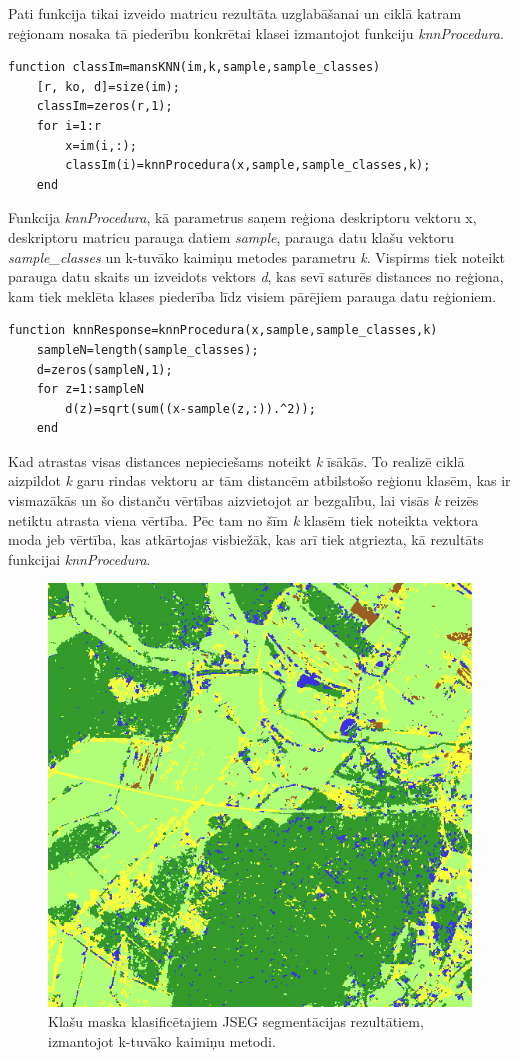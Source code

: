 \documentclass[12pt,paper=a4]{report}
\begin{document}
Pati funkcija tikai izveido matricu rezultāta uzglabāšanai un ciklā katram reģionam nosaka tā piederību konkrētai klasei izmantojot funkciju \textit{knnProcedura}.
\begin{lstlisting}
function classIm=mansKNN(im,k,sample,sample_classes)
    [r, ko, d]=size(im);
    classIm=zeros(r,1);
    for i=1:r
        x=im(i,:);
        classIm(i)=knnProcedura(x,sample,sample_classes,k);
    end
\end{lstlisting}\par
Funkcija \textit{knnProcedura}, kā parametrus saņem reģiona deskriptoru vektoru x, deskriptoru matricu parauga datiem \textit{sample}, parauga datu klašu vektoru \textit{sample_classes} un k-tuvāko kaimiņu metodes parametru \textit{k}. Vispirms tiek noteikt parauga datu skaits un izveidots vektors \textit{d}, kas sevī saturēs distances no reģiona, kam tiek meklēta klases piederība līdz visiem pārējiem parauga datu reģioniem.
\begin{lstlisting}
function knnResponse=knnProcedura(x,sample,sample_classes,k)
    sampleN=length(sample_classes);
    d=zeros(sampleN,1);
    for z=1:sampleN
        d(z)=sqrt(sum((x-sample(z,:)).^2));
    end
\end{lstlisting}\par
Kad atrastas visas distances nepieciešams noteikt \textit{k} īsākās. To realizē ciklā aizpildot \textit{k} garu rindas vektoru ar tām distancēm atbilstošo reģionu klasēm, kas ir vismazākās un šo distanču vērtības aizvietojot ar bezgalību, lai visās \textit{k} reizēs netiktu atrasta viena vērtība. Pēc tam no šīm \textit{k} klasēm tiek noteikta vektora moda jeb vērtība, kas atkārtojas visbiežāk, kas arī tiek atgriezta, kā rezultāts funkcijai \textit{knnProcedura}.
\begin{figure}[h!]
\centering
\includegraphics[width=.6\linewidth]{result}
\caption{Klašu maska klasificētajiem JSEG segmentācijas rezultātiem, izmantojot k-tuvāko kaimiņu metodi.}
\label{fig:resultKNN}
\end{figure}
\end{document}
